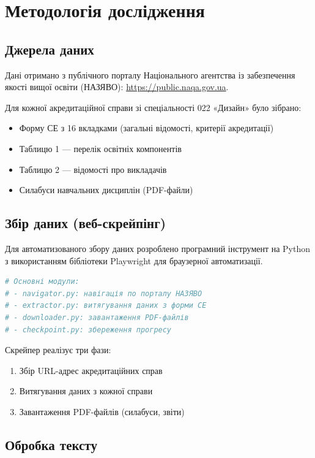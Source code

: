 \chapter{Методологія дослідження}

\section{Джерела даних}

Дані отримано з публічного порталу Національного агентства із забезпечення
якості вищої освіти (НАЗЯВО): \url{https://public.naqa.gov.ua}.

Для кожної акредитаційної справи зі спеціальності 022 «Дизайн» було зібрано:
\begin{itemize}
    \item Форму СЕ з 16 вкладками (загальні відомості, критерії акредитації)
    \item Таблицю 1 --- перелік освітніх компонентів
    \item Таблицю 2 --- відомості про викладачів
    \item Силабуси навчальних дисциплін (PDF-файли)
\end{itemize}

\section{Збір даних (веб-скрейпінг)}

Для автоматизованого збору даних розроблено програмний інструмент на Python
з використанням бібліотеки Playwright для браузерної автоматизації.

\begin{lstlisting}[language=Python,caption={Архітектура скрейпера}]
# Основні модули:
# - navigator.py: навігація по порталу НАЗЯВО
# - extractor.py: витягування даних з форми СЕ
# - downloader.py: завантаження PDF-файлів
# - checkpoint.py: збереження прогресу
\end{lstlisting}

Скрейпер реалізує три фази:
\begin{enumerate}
    \item Збір URL-адрес акредитаційних справ
    \item Витягування даних з кожної справи
    \item Завантаження PDF-файлів (силабуси, звіти)
\end{enumerate}

\section{Обробка тексту}

